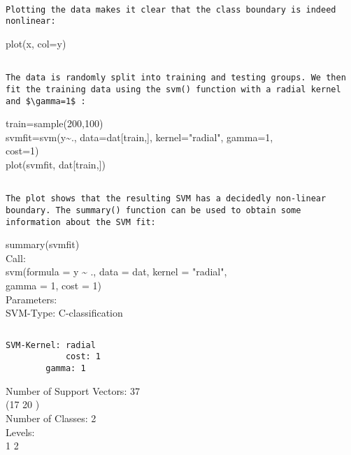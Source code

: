 \documentclass[10pt]{article}
\begin{document}
\begin{verbatim}

Plotting the data makes it clear that the class boundary is indeed nonlinear:
\end{verbatim}

\begin{displayquote}
plot(x, col=y)
\end{displayquote}

\begin{verbatim}

The data is randomly split into training and testing groups. We then fit the training data using the svm() function with a radial kernel and $\gamma=1$ :
\end{verbatim}

\begin{displayquote}
train=sample(200,100)\\[0pt]
svmfit=svm(y\~{}., data=dat[train,], kernel="radial", gamma=1,\\
cost=1)\\[0pt]
plot(svmfit, dat[train,])
\end{displayquote}

\begin{verbatim}

The plot shows that the resulting SVM has a decidedly non-linear boundary. The summary() function can be used to obtain some information about the SVM fit:
\end{verbatim}

\begin{displayquote}
summary(svmfit)\\
Call:\\
svm(formula = y \~{} ., data = dat, kernel = "radial",\\
gamma = 1, cost = 1)\\
Parameters:\\
SVM-Type: C-classification
\end{displayquote}

\begin{verbatim}

\end{verbatim}

\begin{verbatim}
SVM-Kernel: radial
            cost: 1
        gamma: 1
\end{verbatim}

Number of Support Vectors: 37\\
(17 20 )\\
Number of Classes: 2\\
Levels:\\
1 2
\end{document}
